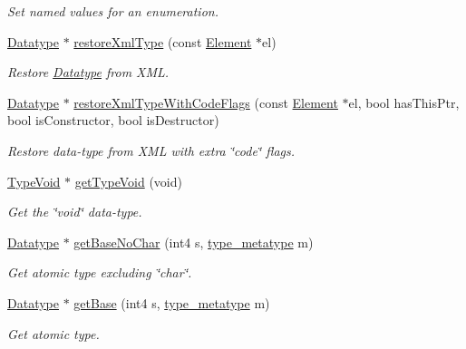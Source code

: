 \begin{DoxyCompactItemize}
\begin{DoxyCompactList}\small\item\em Set named values for an enumeration. \end{DoxyCompactList}\item 
\mbox{\hyperlink{class_datatype}{Datatype}} $\ast$ \mbox{\hyperlink{class_type_factory_aea5f4036abb11e63ca5f79a9eacfc93c}{restore\+Xml\+Type}} (const \mbox{\hyperlink{class_element}{Element}} $\ast$el)
\begin{DoxyCompactList}\small\item\em Restore \mbox{\hyperlink{class_datatype}{Datatype}} from X\+ML. \end{DoxyCompactList}\item 
\mbox{\hyperlink{class_datatype}{Datatype}} $\ast$ \mbox{\hyperlink{class_type_factory_a1b1dcb82c1c7493b55aae9b339e909c7}{restore\+Xml\+Type\+With\+Code\+Flags}} (const \mbox{\hyperlink{class_element}{Element}} $\ast$el, bool has\+This\+Ptr, bool is\+Constructor, bool is\+Destructor)
\begin{DoxyCompactList}\small\item\em Restore data-\/type from X\+ML with extra \char`\"{}code\char`\"{} flags. \end{DoxyCompactList}\item 
\mbox{\hyperlink{class_type_void}{Type\+Void}} $\ast$ \mbox{\hyperlink{class_type_factory_ab7277908ef32101f172633ec00fbecb1}{get\+Type\+Void}} (void)
\begin{DoxyCompactList}\small\item\em Get the \char`\"{}void\char`\"{} data-\/type. \end{DoxyCompactList}\item 
\mbox{\hyperlink{class_datatype}{Datatype}} $\ast$ \mbox{\hyperlink{class_type_factory_adca2937f24e37c5ac19ba442cd1df0d8}{get\+Base\+No\+Char}} (int4 s, \mbox{\hyperlink{type_8hh_aef6429f2523cdf4d415ba04a0209e61f}{type\+\_\+metatype}} m)
\begin{DoxyCompactList}\small\item\em Get atomic type excluding \char`\"{}char\char`\"{}. \end{DoxyCompactList}\item 
\mbox{\hyperlink{class_datatype}{Datatype}} $\ast$ \mbox{\hyperlink{class_type_factory_a5fe1ae26c0b76b18d59d5cd27a9b8ff1}{get\+Base}} (int4 s, \mbox{\hyperlink{type_8hh_aef6429f2523cdf4d415ba04a0209e61f}{type\+\_\+metatype}} m)
\begin{DoxyCompactList}\small\item\em Get atomic type. \end{DoxyCompactList}\item 

\end{DoxyCompactItemize}
